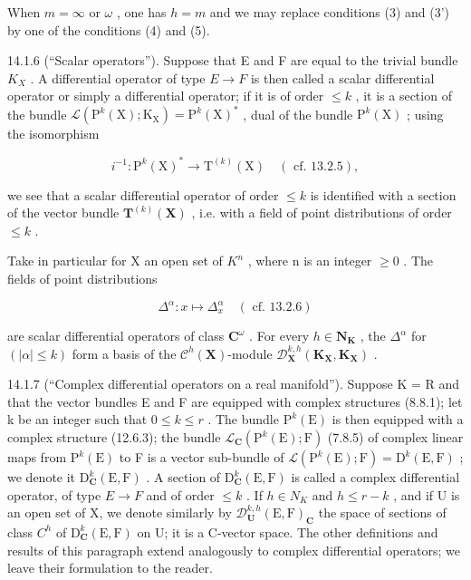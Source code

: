 When \(m = \infty\) or \(\omega\) , one has \(h = m\) and we may replace conditions (3) and (3') by one of the conditions (4) and (5).

14.1.6 (“Scalar operators”). Suppose that E and F are equal to the trivial bundle \(K_{X}\) . A differential operator of type \(E \rightarrow F\) is then called a scalar differential operator or simply a differential operator; if it is of order \(\leqslant k\) , it is a section of the bundle \(\mathcal{L}(\mathrm{P}^{k}(\mathrm{X}); \mathrm{K}_{\mathrm{X}}) = \mathrm{P}^{k}(\mathrm{X})^{*}\) , dual of the bundle \(\mathrm{P}^{k}(\mathrm{X})\) ; using the isomorphism

\[
i ^ {- 1} \colon \mathrm{P} ^ {k} (\mathrm{X}) ^ {*} \rightarrow \mathrm{T} ^ {(k)} (\mathrm{X}) \quad (\text { cf. } 13.2.5),
\]

we see that a scalar differential operator of order \(\leqslant k\) is identified with a section of the vector bundle \(\mathbf{T}^{(k)}(\mathbf{X})\) , i.e. with a field of point distributions of order \(\leqslant k\) .

Take in particular for X an open set of \(K^{n}\) , where n is an integer \(\geqslant0\) . The fields of point distributions

\[
\Delta^ {\alpha} \colon x \mapsto \Delta_ {x} ^ {\alpha} \quad (\text { cf. } 1 3. 2. 6)
\]

are scalar differential operators of class \(\mathbf{C}^{\omega}\) . For every \(h\in\mathbf{N}_{\mathbf{K}}\) , the \(\Delta^{\alpha}\) for \((|\alpha|\leqslant k)\) form a basis of the \(\mathcal{C}^{h}(\mathbf{X})\)-module \(\mathcal{D}_{\mathbf{X}}^{k,h}(\mathbf{K}_{\mathbf{X}},\mathbf{K}_{\mathbf{X}})\) .

14.1.7 (“Complex differential operators on a real manifold”). Suppose K = R and that the vector bundles E and F are equipped with complex structures (8.8.1); let k be an integer such that \(0 \leqslant k \leqslant r\) . The bundle \(\mathrm{P}^{k}(\mathrm{E})\) is then equipped with a complex structure (12.6.3); the bundle \(\mathcal{L}_{\mathbf{C}}(\mathrm{P}^{k}(\mathrm{E}); \mathrm{F})\) (7.8.5) of complex linear maps from \(\mathrm{P}^{k}(\mathrm{E})\) to F is a vector sub-bundle of \(\mathcal{L}(\mathrm{P}^{k}(\mathrm{E}); \mathrm{F}) = \mathrm{D}^{k}(\mathrm{E}, \mathrm{F})\) ; we denote it \(\mathrm{D}_{\mathbf{C}}^{k}(\mathrm{E}, \mathrm{F})\) . A section of \(\mathrm{D}_{\mathbf{C}}^{k}(\mathrm{E}, \mathrm{F})\) is called a complex differential operator, of type \(E \to F\) and of order \(\leqslant k\) . If \(h \in N_{K}\) and \(h \leqslant r - k\) , and if U is an open set of X, we denote similarly by \(\mathcal{D}_{\mathbf{U}}^{k,h}(\mathrm{E}, \mathrm{F})_{\mathbf{C}}\) the space of sections of class \(C^{h}\) of \(\mathrm{D}_{\mathbf{C}}^{k}(\mathrm{E}, \mathrm{F})\) on U; it is a C-vector space. The other definitions and results of this paragraph extend analogously to complex differential operators; we leave their formulation to the reader.

